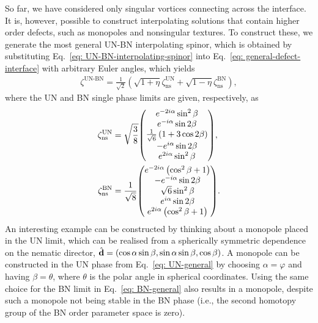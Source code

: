 So far, we have considered only singular vortices connecting across the
interface.
It is, however, possible to construct interpolating solutions that contain
higher order defects, such as monopoles and nonsingular textures.
To construct these, we generate the most general UN-BN interpolating spinor,
which is obtained by substituting Eq.~\eqref{eq: UN-BN-interpolating-spinor}
into Eq.~\eqref{eq: general-defect-interface} with arbitrary Euler
angles, which yields
\begin{align}\label{eq: UN-BN-general}
    \zeta^\text{UN-BN}=\frac{1}{\sqrt{2}}\left(
        \sqrt{1+\eta}\zeta^\text{UN}_\text{ns} + 
        \sqrt{1-\eta}\zeta^\text{BN}_\text{ns}
        \right),
\end{align}
where the UN and BN single phase limits are given, respectively, as
\begin{align}\label{eq: UN-general}
    \zeta^\text{UN}_\text{ns} &= \sqrt{\frac{3}{8}}
    \mqty(
        e^{-2i\alpha}\sin^2\beta \\
        e^{-i\alpha}\sin 2 \beta \\
        \frac{1}{\sqrt{6}}\left(1+3\cos 2\beta\right) \\
        -e^{i\alpha} \sin 2 \beta \\
        e^{2i\alpha}\sin^2\beta
    ), \\
    \zeta^\text{BN}_\text{ns} &= \frac{1}{\sqrt{8}} \label{eq: BN-general}
    \mqty(
        e^{-2i\alpha}\left(\cos^2\beta + 1\right) \\
        - e^{-i\alpha}\sin 2 \beta \\
        \sqrt{6}\sin^2\beta \\
        e^{i\alpha}\sin 2 \beta \\
        e^{2i\alpha}\left(\cos^2\beta + 1\right)          
    ).
\end{align}
An interesting example can be constructed by thinking about a monopole placed in
the UN limit, which can be realised from a spherically symmetric dependence
on the nematic director, \(\hat{\vb{d}} = (\cos\alpha \sin\beta, \sin\alpha
\sin\beta, \cos\beta)\).
A monopole can be constructed in the UN phase from Eq.~\eqref{eq: UN-general}
by choosing \(\alpha=\varphi \) and having \(\beta = \theta \), where
\(\theta \) is the polar angle in spherical coordinates.
Using the same choice for the BN limit in Eq.~\eqref{eq: BN-general} also
results in a monopole, despite such a monopole not being stable in the BN phase
(i.e., the second homotopy group of the BN order parameter space is zero).

